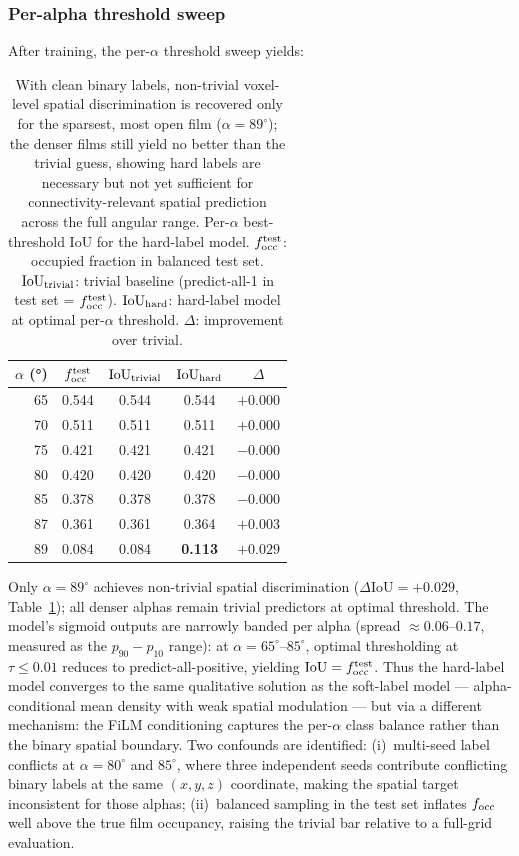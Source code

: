 \documentclass[aip,amsmath,amssymb,reprint]{revtex4-1}
\renewcommand{\ang}{\ensuremath{\alpha}} %
\newcommand{\iou}{\ensuremath{\mathrm{IoU}}}
\begin{document}
\subsubsection{Per-alpha threshold sweep}

After training, the per-$\alpha$ threshold sweep yields:

\begin{table}[htbp]
  \centering
  \caption{%
    With clean binary labels, non-trivial voxel-level spatial
    discrimination is recovered only for the sparsest, most
    open film ($\ang=89^{\circ}$); the denser films still yield no
    better than the trivial guess, showing hard labels are
    necessary but not yet sufficient for connectivity-relevant
    spatial prediction across the full angular range.
    Per-$\alpha$ best-threshold IoU for the hard-label model.
    $f_{\rm occ}^{\rm test}$: occupied fraction in balanced test set.
    $\iou_{\rm trivial}$: trivial baseline (predict-all-1 in test set = $f_{\rm occ}^{\rm test}$).
    $\iou_{\rm hard}$: hard-label model at optimal per-$\alpha$ threshold.
    $\Delta$: improvement over trivial.
  }
  \label{tab:hard_iou}
  \begin{tabular}{rcccc}
    \toprule
    $\ang$ (°) & $f_{\rm occ}^{\rm test}$ & $\iou_{\rm trivial}$ & $\iou_{\rm hard}$ & $\Delta$ \\
    \midrule
    65 & 0.544 & 0.544 & 0.544 & $+0.000$ \\
    70 & 0.511 & 0.511 & 0.511 & $+0.000$ \\
    75 & 0.421 & 0.421 & 0.421 & $-0.000$ \\
    80 & 0.420 & 0.420 & 0.420 & $-0.000$ \\
    85 & 0.378 & 0.378 & 0.378 & $-0.000$ \\
    87 & 0.361 & 0.361 & 0.364 & $+0.003$ \\
    89 & 0.084 & 0.084 & \textbf{0.113} & $\mathbf{+0.029}$ \\
    \bottomrule
  \end{tabular}
\end{table}

Only $\ang = 89^{\circ}$ achieves non-trivial spatial discrimination
($\Delta\iou = +0.029$, Table~\ref{tab:hard_iou}); all denser alphas
remain trivial predictors at optimal threshold.
The model's sigmoid outputs are narrowly banded per alpha
(spread $\approx 0.06$--$0.17$, measured as the $p_{90}-p_{10}$ range):
at $\ang = 65^{\circ}$--$85^{\circ}$, optimal thresholding at $\tau \leq 0.01$
reduces to predict-all-positive, yielding $\iou = f_{\rm occ}^{\rm test}$.
Thus the hard-label model converges to the same qualitative solution as
the soft-label model — alpha-conditional mean density with weak spatial
modulation — but via a different mechanism: the FiLM conditioning
captures the per-$\alpha$ class balance rather than the binary spatial
boundary.
Two confounds are identified: (i)~multi-seed label conflicts at
$\ang = 80^{\circ}$ and $85^{\circ}$, where three independent seeds contribute
conflicting binary labels at the same $(x,y,z)$ coordinate,
making the spatial target inconsistent for those alphas;
(ii)~balanced sampling in the test set inflates $f_{\rm occ}$ well
above the true film occupancy, raising the trivial bar relative
to a full-grid evaluation.
\end{document}
